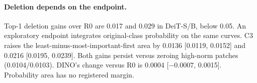 \paragraph{Deletion depends on the endpoint.} Top-1 deletion gains over R0 are 0.017 and 0.029 in DeiT-S/B, below 0.05. An exploratory endpoint integrates original-class probability on the same curves. C3 raises the least-minus-most-important-first area by 0.0136 [0.0119, 0.0152] and 0.0216 [0.0195, 0.0239]. Both gains persist versus zeroing high-norm patches (0.0104/0.0103). DINO's change versus R0 is 0.0004 [$-0.0007$, 0.0015]. Probability area has no registered margin.

